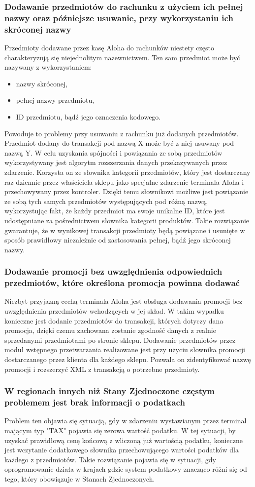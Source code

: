 \documentclass[a4paper]{book}
\begin{document}
\subsubsection{Dodawanie przedmiotów do rachunku z użyciem ich pełnej nazwy oraz późniejsze usuwanie, przy wykorzystaniu ich skróconej nazwy}
Przedmioty dodawane przez kasę Aloha do rachunków niestety często charakteryzują się niejednolitym nazewnictwem. Ten sam przedmiot może być nazywany z wykorzystaniem:
 \begin{itemize}
	\item nazwy skróconej,
	\item pełnej nazwy przedmiotu,
	\item ID przedmiotu, bądź jego oznaczenia kodowego.
\end{itemize}
Powoduje to problemy przy usuwaniu z rachunku już dodanych przedmiotów. Przedmiot dodany do transakcji pod nazwą X może być z niej usuwany pod nazwą Y. W celu uzyskania spójności i powiązania ze sobą przedmiotów wykorzystywany jest algorytm rozszerzania danych przekazywanych przez zdarzenie. Korzysta on ze słownika kategorii przedmiotów, który jest dostarczany raz dziennie przez właściciela sklepu jako specjalne zdarzenie terminala Aloha i przechowywany przez kontroler. Dzięki temu słownikowi możliwe jest powiązanie ze sobą tych samych przedmiotów występujących pod różną nazwą, wykorzystując fakt, że każdy przedmiot ma swoje unikalne ID, które jest udostępniane za pośrednictwem słownika kategorii produktów. Takie rozwiązanie gwarantuje, że w wynikowej transakcji przedmioty będą powiązane i usunięte w sposób prawidłowy niezależnie od zastosowania pełnej, bądź jego skróconej nazwy.
\subsubsection{Dodawanie promocji bez uwzględnienia odpowiednich przedmiotów, które określona promocja powinna dodawać}
Niezbyt przyjazną cechą terminala Aloha jest obsługa dodawania promocji bez uwzględnienia przedmiotów wchodzących w jej skład. W takim wypadku konieczne jest dodanie przedmiotów do transakcji, których dotyczy dana promocja, dzięki czemu zachowana zostanie zgodność danych z realnie sprzedanymi przedmiotami po stronie sklepu. Dodawanie przedmiotów przez moduł wstępnego przetwarzania realizowane jest przy użyciu słownika promocji dostarczanego przez klienta dla każdego sklepu. Pozwala on zidentyfikować nazwę promocji i rozszerzyć XML z transakcją o potrzebne przedmioty. 
\subsubsection{W regionach innych niż Stany Zjednoczone częstym problemem jest brak informacji o podatkach}
Problem ten objawia się sytuacją, gdy w zdarzeniu wystawianym przez terminal mającym typ "TAX" pojawia się zerowa wartość podatku. W tej sytuacji, by uzyskać prawidłową cenę końcową z wliczoną już wartością podatku, konieczne jest wczytanie dodatkowego słownika przechowującego wartości podatków dla każdego z przedmiotów. Takie rozwiązanie pojawia się w sytuacji, gdy oprogramowanie działa w krajach gdzie system podatkowy znacząco różni się od tego, który obowiązuje w Stanach Zjednoczonych. 
\end{document}
